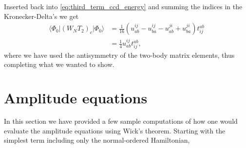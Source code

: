 \documentclass[
    a4paper, aps, twocolumn, floatfix, superscriptaddress,
    nofootinbib]{revtex4-1}
\newcommand{\1}{\mathds{1}}
\newcommand{\para}[1]{\left(#1\right)}
\newcommand{\bra}[1]{\langle #1\lvert}
\newcommand{\ket}[1]{\rvert #1\rangle}
\newcommand{\kslat}{\ket{\Phi_0}}
\newcommand{\bslat}{\bra{\Phi_0}}
\begin{document}
    Inserted back into \autoref{eq:third_term_ccd_energy} and summing the
    indices in the Kronecker-Delta's we get
    \begin{align}
        \bslat (W_N T_2)_c\kslat
        &=
        \frac{1}{16}\para{
            u^{ij}_{ab} - u^{ij}_{ba} - u^{ji}_{ab} + u^{ji}_{ba}
        }
        t^{ab}_{ij}
        \nonumber \\
        &=
        \frac{1}{4}u^{ij}_{ab}t^{ab}_{ij},
    \end{align}
    where we have used the antisymmetry of the two-body matrix elements, thus
    completing what we wanted to show.

\section{Amplitude equations}

    \label{app:wick_on_amplitude}

    In this section we have provided a few sample computations of how one would
    evaluate the amplitude equations using Wick's theorem. Starting with the
    simplest term including only the normal-ordered Hamiltonian,
\end{document}

